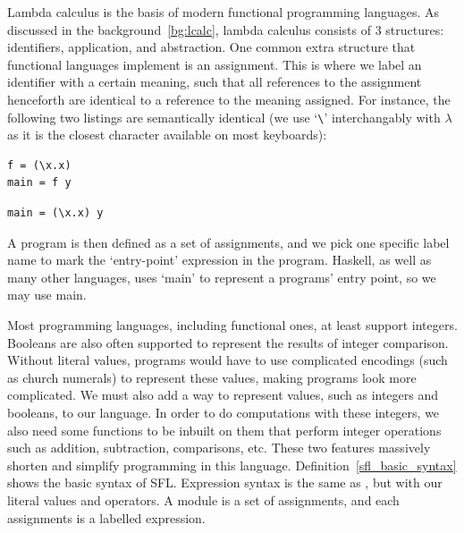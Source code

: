 Lambda calculus is the basis of modern functional programming languages. As discussed in the background~\ref{bg:lcalc}, lambda calculus consists of 3 structures: identifiers, application, and abstraction. One common extra structure that functional languages implement is an assignment. This is where we label an identifier with a certain meaning, such that all references to the assignment henceforth are identical to a reference to the meaning assigned. For instance, the following two listings are semantically identical (we use `\verb|\|' interchangably with \(\lambda\) as it is the closest character available on most keyboards):
\begin{lstlisting}[language=SFL]
f = (\x.x)
main = f y
\end{lstlisting}
\begin{lstlisting}[language=SFL]
main = (\x.x) y
\end{lstlisting}
A program is then defined as a set of assignments, and we pick one specific label name to mark the `entry-point' expression in the program. Haskell, as well as many other languages, uses `main' to represent a programs' entry point, so we may use main. 

Most programming languages, including functional ones, at least support integers. Booleans are also often supported to represent the results of integer comparison. Without literal values, programs would have to use complicated encodings (such as church numerals) to represent these values, making programs look more complicated.  We must also add a way to represent values, such as integers and booleans, to our language. In order to do computations with these integers, we also need some functions to be inbuilt on them that perform integer operations such as addition, subtraction, comparisons, etc. 
These two features massively shorten and simplify programming in this language. Definition~\ref{sfl_basic_syntax} shows the basic syntax of \ac{SFL}. Expression syntax is the same as \lcalc, but with our literal values and operators. A module is a set of assignments, and each assignments is a labelled expression.

